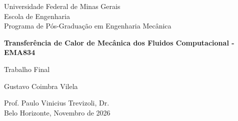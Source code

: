 \begin{titlepage}
\begin{center}
{\large Universidade Federal de Minas Gerais\\
Escola de Engenharia \\
Programa de Pós-Graduação em Engenharia Mecânica\\}

\vspace{6cm}
{\bf\Large Transferência de Calor de Mecânica dos Fluidos Computacional - EMA834\vspace{1.0cm}

Trabalho Final}
\vspace{4cm}

{\large Gustavo Coimbra Vilela}
\vspace{2cm}  
   
\vspace{2cm}          
{\large Prof. Paulo Vinicius Trevizoli, Dr.}\\


\vfill
{\large Belo Horizonte, Novembro de 2026 }
\end{center}

\end{titlepage}